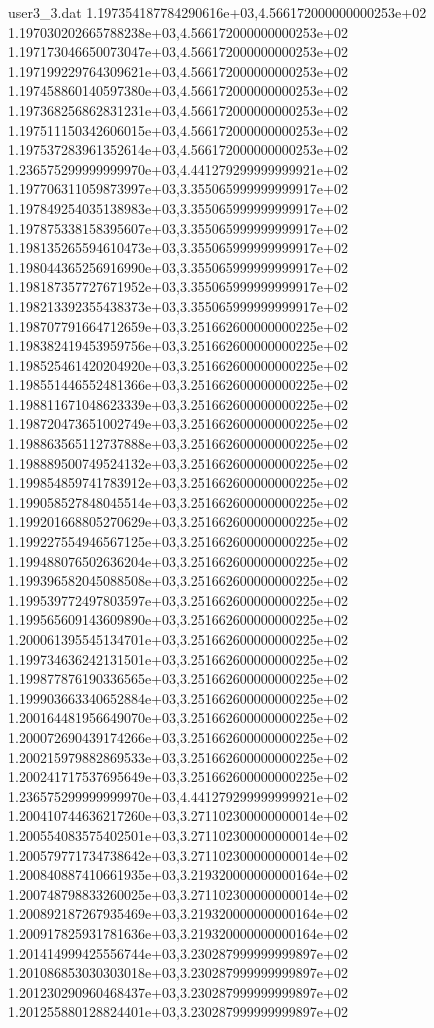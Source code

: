 \begin{filecontents}{user3_3.dat}
1.197354187784290616e+03,4.566172000000000253e+02
1.197030202665788238e+03,4.566172000000000253e+02
1.197173046650073047e+03,4.566172000000000253e+02
1.197199229764309621e+03,4.566172000000000253e+02
1.197458860140597380e+03,4.566172000000000253e+02
1.197368256862831231e+03,4.566172000000000253e+02
1.197511150342606015e+03,4.566172000000000253e+02
1.197537283961352614e+03,4.566172000000000253e+02
1.236575299999999970e+03,4.441279299999999921e+02
1.197706311059873997e+03,3.355065999999999917e+02
1.197849254035138983e+03,3.355065999999999917e+02
1.197875338158395607e+03,3.355065999999999917e+02
1.198135265594610473e+03,3.355065999999999917e+02
1.198044365256916990e+03,3.355065999999999917e+02
1.198187357727671952e+03,3.355065999999999917e+02
1.198213392355438373e+03,3.355065999999999917e+02
1.198707791664712659e+03,3.251662600000000225e+02
1.198382419453959756e+03,3.251662600000000225e+02
1.198525461420204920e+03,3.251662600000000225e+02
1.198551446552481366e+03,3.251662600000000225e+02
1.198811671048623339e+03,3.251662600000000225e+02
1.198720473651002749e+03,3.251662600000000225e+02
1.198863565112737888e+03,3.251662600000000225e+02
1.198889500749524132e+03,3.251662600000000225e+02
1.199854859741783912e+03,3.251662600000000225e+02
1.199058527848045514e+03,3.251662600000000225e+02
1.199201668805270629e+03,3.251662600000000225e+02
1.199227554946567125e+03,3.251662600000000225e+02
1.199488076502636204e+03,3.251662600000000225e+02
1.199396582045088508e+03,3.251662600000000225e+02
1.199539772497803597e+03,3.251662600000000225e+02
1.199565609143609890e+03,3.251662600000000225e+02
1.200061395545134701e+03,3.251662600000000225e+02
1.199734636242131501e+03,3.251662600000000225e+02
1.199877876190336565e+03,3.251662600000000225e+02
1.199903663340652884e+03,3.251662600000000225e+02
1.200164481956649070e+03,3.251662600000000225e+02
1.200072690439174266e+03,3.251662600000000225e+02
1.200215979882869533e+03,3.251662600000000225e+02
1.200241717537695649e+03,3.251662600000000225e+02
1.236575299999999970e+03,4.441279299999999921e+02
1.200410744636217260e+03,3.271102300000000014e+02
1.200554083575402501e+03,3.271102300000000014e+02
1.200579771734738642e+03,3.271102300000000014e+02
1.200840887410661935e+03,3.219320000000000164e+02
1.200748798833260025e+03,3.271102300000000014e+02
1.200892187267935469e+03,3.219320000000000164e+02
1.200917825931781636e+03,3.219320000000000164e+02
1.201414999425556744e+03,3.230287999999999897e+02
1.201086853030303018e+03,3.230287999999999897e+02
1.201230290960468437e+03,3.230287999999999897e+02
1.201255880128824401e+03,3.230287999999999897e+02

\end{filecontents}
